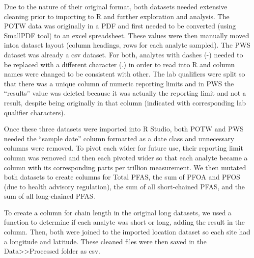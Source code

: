 \documentclass[
  12pt,
]{article}
\begin{document}
Due to the nature of their original format, both datasets needed
extensive cleaning prior to importing to R and further exploration and
analysis. The POTW data was originally in a PDF and first needed to be
converted (using SmallPDF tool) to an excel spreadsheet. These values
were then manually moved intoa dataset layout (column headings, rows for
each analyte sampled). The PWS dataset was already a csv dataset. For
both, analytes with dashes (-) needed to be replaced with a different
character (.) in order to read into R and column names were changed to
be consistent with other. The lab qualifiers were split so that there
was a unique column of numeric reporting limits and in PWS the
``results'' value was deleted because it was actually the reporting
limit and not a result, despite being originally in that column
(indicated with corresponding lab qualifier characters).

Once these three datasets were imported into R Studio, both POTW and PWS
needed the ``sample date'' column formatted as a date class and
unnecessary columns were removed. To pivot each wider for future use,
their reporting limit column was removed and then each pivoted wider so
that each analyte became a column with its corresponding parts per
trillion measurement. We then mutated both datasets to create columns
for Total PFAS, the sum of PFOA and PFOS (due to health advisory
regulation), the sum of all short-chained PFAS, and the sum of all
long-chained PFAS.

To create a column for chain length in the original long datasets, we
used a function to determine if each analyte was short or long, adding
the result in the column. Then, both were joined to the imported
location dataset so each site had a longitude and latitude. These
cleaned files were then saved in the
Data\textgreater\textgreater Processed folder as csv.
\end{document}
